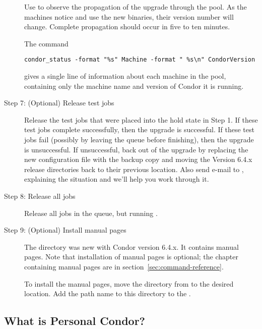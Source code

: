 \begin{description}
Use  to observe the propagation of the upgrade
through the pool.
As the machines notice and use the new binaries, their
version number will change.
Complete propagation should occur in five to ten minutes.

The command
\footnotesize
\begin{verbatim}
condor_status -format "%s" Machine -format " %s\n" CondorVersion
\end{verbatim}
\normalsize
gives a single line of information about each machine in the pool,
containing only the machine name and version of Condor it is
running.

\item[Step 7:  (Optional) Release test jobs]
Release the test jobs that were placed into the hold state
in Step 1.
If these test jobs complete successfully, then the upgrade is
successful.
If these test jobs fail (possibly by leaving the queue before
finishing), then the upgrade is unsuccessful.
If unsuccessful, back out of the upgrade by
replacing the new configuration file with the backup copy and
moving the Version 6.4.x release directories back to their
previous location.
Also send e-mail to ,
explaining the situation and we'll help you work through it.

\item[Step 8:  Release all jobs]
Release all jobs in the queue, but running .

\item[Step 9:  (Optional) Install manual pages]

The  directory was new with Condor version 6.4.x.
It contains manual pages.
Note that installation of manual pages is optional;
the chapter containing manual pages are in
section~\ref{sec:command-reference}.

To install the manual pages, move the  directory
from  to the desired location.
Add the path name to this directory to the
.

\end{description}

%

\subsection*{What is Personal Condor?}

